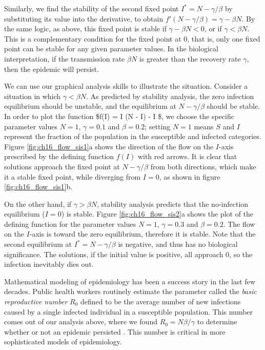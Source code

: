 \documentclass[
]{book}
\theoremstyle{definition}
\theoremstyle{definition}
\theoremstyle{definition}
\theoremstyle{remark}
\begin{document}
Similarly, we find the stability of the second fixed point \(I^* = N - \gamma/\beta\) by substituting its value into the derivative, to obtain \(f'(N - \gamma/\beta) = \gamma - \beta N\). By the same logic, as above, this fixed point is stable if \(\gamma - \beta N < 0\), or if \(\gamma < \beta N\). This is a complementary condition for the fixed point at 0, that is, only one fixed point can be stable for any given parameter values. In the biological interpretation, if the transmission rate \(\beta N\) is greater than the recovery rate \(\gamma\), then the epidemic will persist.

We can use our graphical analysis skills to illustrate the situation. Consider a situation in which \(\gamma < \beta N\). As predicted by stability analysis, the zero infection equilibrium should be unstable, and the equilibrium at \(N - \gamma/\beta\) should be stable. In order to plot the function \$f(I) = \beta I (N - I) - \gamma I \$, we choose the specific parameter values \(N=1\), \(\gamma = 0.1\) and \(\beta = 0.2\); setting \(N=1\) means \(S\) and \(I\) represent the fraction of the population in the susceptible and infected categories. Figure \ref{fig:ch16_flow_sis1}a shows the direction of the flow on the \(I\)-axis prescribed by the defining function \(f(I)\) with red arrows. It is clear that solutions approach the fixed point at \(N - \gamma/\beta\) from both directions, which make it a stable fixed point, while diverging from \(I=0\), as shown in figure \ref{fig:ch16_flow_sis1}b.

On the other hand, if \(\gamma > \beta N\), stability analysis predicts that the no-infection equilibrium (\(I=0\)) is stable. Figure \ref{fig:ch16_flow_sis2}a shows the plot of the defining function for the parameter values \(N=1\), \(\gamma = 0.3\) and \(\beta = 0.2\). The flow on the \(I\)-axis is toward the zero equilibrium, therefore it is stable. Note that the second equilibrium at \(I^* = N - \gamma/\beta\) is negative, and thus has no biological significance. The solutions, if the initial value is positive, all approach 0, so the infection inevitably dies out.

Mathematical modeling of epidemiology has been a success story in the last few decades. Public health workers routinely estimate the parameter called the  \emph{basic reproductive number} \(R_0\) defined to be the average number of new infections caused by a single infected individual in a susceptible population. This number comes out of our analysis above, where we found \(R_0 = N \beta/\gamma\) to determine whether or not an epidemic persisted \citep{brauer_mathematical_2011}. This number is critical in more sophisticated models of epidemiology.
\end{document}

